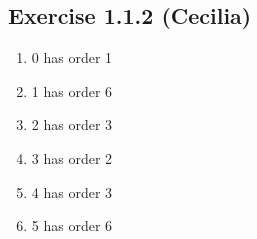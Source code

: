 \subsection*{Exercise 1.1.2 (Cecilia)}

\begin{enumerate}
    \item{0 has order 1}
    \item{1 has order 6}
    \item{2 has order 3}
    \item{3 has order 2}
    \item{4 has order 3}
    \item{5 has order 6}
\end{enumerate}